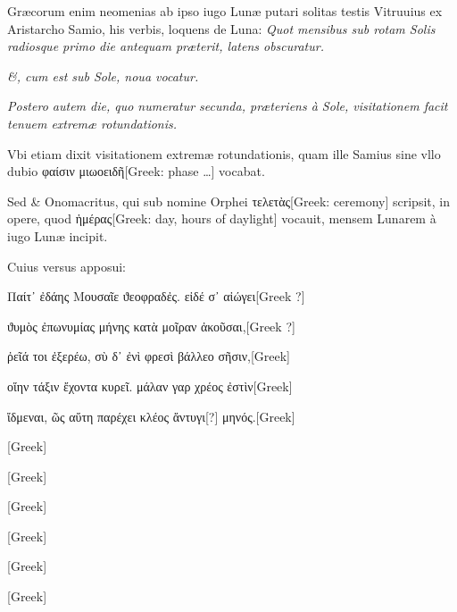 \begin{parnumbers}

Græcorum enim neomenias ab ipso iugo Lunæ putari solitas testis Vitruuius ex Aristarcho Samio, his verbis, loquens de Luna: \textit{Quot mensibus sub rotam Solis radiosque primo die  antequam præterit, latens obscuratur.}

\textit{\&, cum est sub Sole, noua vocatur.}

\textit{Postero autem die, quo numeratur secunda, præteriens à Sole, visitationem facit tenuem extremæ rotundationis.}

Vbi etiam dixit visitationem extremæ rotundationis, quam ille Samius sine vllo dubio \textgreek{φαίσιν μιωοειδῆ[Greek: phase …]} vocabat.

Sed \& Onomacritus, qui sub nomine Orphei \textgreek{τελετὰς[Greek: ceremony]} scripsit, in opere, quod \textgreek{ἡμέρας[Greek: day, hours of daylight]} vocauit, mensem Lunarem à iugo Lunæ incipit.

Cuius versus apposui:

\begin{greek}
Παίτ᾽ ἐδάης Μουσαῖε ϑεοφραδἐς. εἰδέ σ᾽ αἰώγει[Greek ?]

ϑυμὸς ἐπωνυμίας μήνης κατὰ μοῖραν ἀκοῦσαι,[Greek ?]

ῤεῖά τοι ἐξερέω, σὺ δ᾽ ἐνὶ φρεσὶ βάλλεο σῆσιν,[Greek] 

οἵην τάξιν ἔχοντα κυρεῖ. μάλαν γαρ χρέος ἐστὶν[Greek]

ἴδμεναι, ῶς αὕτη παρέχει κλέος ἄντυγι[?] μηνός.[Greek]

\textgreek{[Greek]}

\textgreek{[Greek]}

\textgreek{[Greek]}

\textgreek{[Greek]}

\textgreek{[Greek]}

\textgreek{[Greek]}
\end{greek}


\end{parnumbers}
